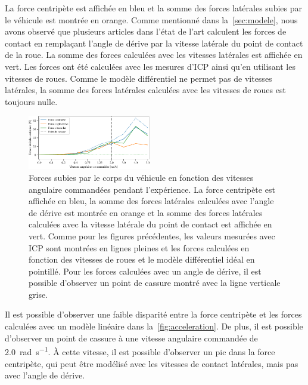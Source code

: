 La force centripète est affichée en bleu et la somme des forces latérales subies par le véhicule est montrée en orange.
Comme mentionné dans la~\autoref{sec:modele}, nous avons observé que plusieurs articles dans l'état de l'art calculent les forces de contact en remplaçant l'angle de dérive par la vitesse latérale du point de contact de la roue.
La somme des forces calculées avec les vitesses latérales est affichée en vert.
Les forces ont été calculées avec les mesures d'\ac{ICP} ainsi qu'en utilisant les vitesses de roues.
Comme le modèle différentiel ne permet pas de vitesses latérales, la somme des forces latérales calculées avec les vitesses de roues est toujours nulle.

\begin{figure}[htpb]
	\centering
	\includegraphics[width=0.48\textwidth]{figs/lateral_forces.pdf}
	\caption{Forces subies par le corps du véhicule en fonction des vitesses angulaire commandées pendant l'expérience.
			La force centripète est affichée en bleu, la somme des forces latérales calculées avec l'angle de dérive est montrée en orange et la somme des forces latérales calculées avec la vitesse latérale du point de contact est affichée en vert.
			Comme pour les figures précédentes, les valeurs mesurées avec \ac{ICP} sont montrées en lignes pleines et les forces calculées en fonction des vitesses de roues et le modèle différentiel idéal en pointillé.
			Pour les forces calculées avec un angle de dérive, il est possible d'observer un point de cassure montré avec la ligne verticale grise.}
	\label{fig:acceleration}
\end{figure}

Il est possible d'observer une faible disparité entre la force centripète et les forces calculées avec un modèle linéaire dans la~\autoref{fig:acceleration}.
De plus, il est possible d'observer un point de cassure à une vitesse angulaire commandée de \SI{2.0}{\radian\per\second}.
À cette vitesse, il est possible d'observer un pic dans la force centripète, qui peut être modélisé avec les vitesses de contact latérales, mais pas avec l'angle de dérive.

